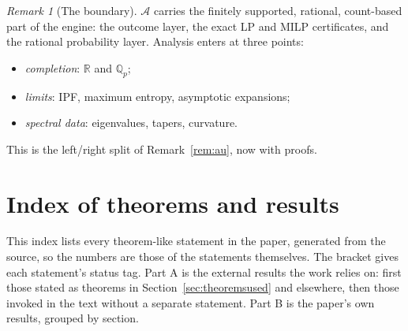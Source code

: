 \documentclass[11pt]{article}
\theoremstyle{definition}
\theoremstyle{remark}
\newtheorem{remark}[theorem]{Remark}
\begin{document}
\begin{remark}[The boundary]\label{rem:boundary}
$\mathcal A$ carries the finitely supported, rational, count-based part of the engine: the outcome layer, the exact LP and MILP certificates, and the rational probability layer. Analysis enters at three points:
\begin{itemize}
  \item \emph{completion}: $\mathbb R$ and $\mathbb Q_p$;
  \item \emph{limits}: IPF, maximum entropy, asymptotic expansions;
  \item \emph{spectral data}: eigenvalues, tapers, curvature.
\end{itemize}
This is the left/right split of Remark~\ref{rem:au}, now with proofs.
\end{remark}

\section{Index of theorems and results}\label{sec:theoremindex}
This index lists every theorem-like statement in the paper, generated from the source, so the numbers are those of the statements themselves. The bracket gives each statement's status tag. Part A is the external results the work relies on: first those stated as theorems in Section~\ref{sec:theoremsused} and elsewhere, then those invoked in the text without a separate statement. Part B is the paper's own results, grouped by section.
\end{document}
